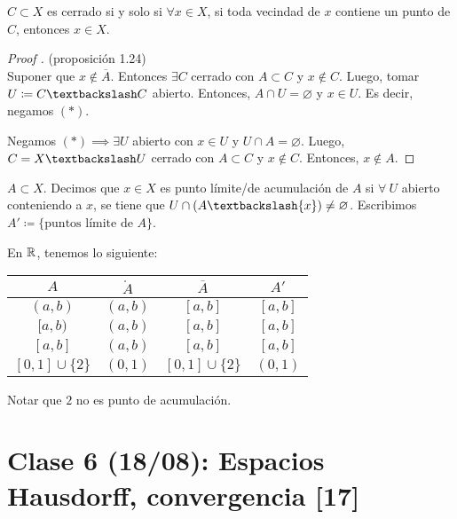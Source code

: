 \documentclass[a4paper]{report}
\begin{document}
	\begin{corollary}
		$C \subset X$ es cerrado si y solo si $\forall x \in X$, si toda vecindad de $x$ contiene un punto de $C$, entonces $x \in X$.
	\end{corollary}

	\begin{proof}[Proof ] (proposición 1.24) \\
		\Ifstep Suponer que $x \not\in \overline{A}$. Entonces $\exists C$ cerrado con $A \subset C$ y $x \not\in C$. Luego, tomar $U \coloneq C \textbackslash C$ abierto. Entonces, $A \cap U = \varnothing$ y $x \in U$. Es decir, negamos $(*)$.

		\noindent \Onlyifstep Negamos $(*) \implies \exists U$ abierto con $x \in U$ y $U \cap A = \varnothing$. Luego, $C = X \textbackslash U$ cerrado con $A \subset C$ y $x \not\in C$. Entonces, $x \not\in A$.
	\end{proof}

	\begin{definition}
		$A \subset X$. Decimos que $x \in X$ es punto límite/de acumulación de $A$ si $\forall \ U$ abierto conteniendo a $x$, se tiene que $U \cap ( A \textbackslash \{ x \} ) \neq \varnothing$. Escribimos $A' \coloneq \{ \text{puntos límite de } A \}$.
	\end{definition}

	\begin{eg}
		En $\mathbb{R}$, tenemos lo siguiente:
		\begin{center}
		\begin{tabular}{ | c | c | c | c | }
			\hline
			$A$ & $\mathring{A}$ & $\overline{A}$ & $A'$ \\
			\hline
			$(a,b)$ & $(a,b)$ & $[a,b]$ & $[a,b]$ \\
			$[a,b)$ & $(a,b)$ & $[a,b]$ & $[a,b]$ \\
			$[a,b]$ & $(a,b)$ & $[a,b]$ & $[a,b]$ \\
			$[0,1] \cup \{2\}$ & $(0,1)$ & $[0,1] \cup \{2\}$ & $(0,1)$ \\
			\hline
		\end{tabular}
		\end{center}
		\noindent Notar que $2$ no es punto de acumulación.
	\end{eg}


	\section{Clase 6 (18/08): Espacios Hausdorff, convergencia [17]}
\end{document}
